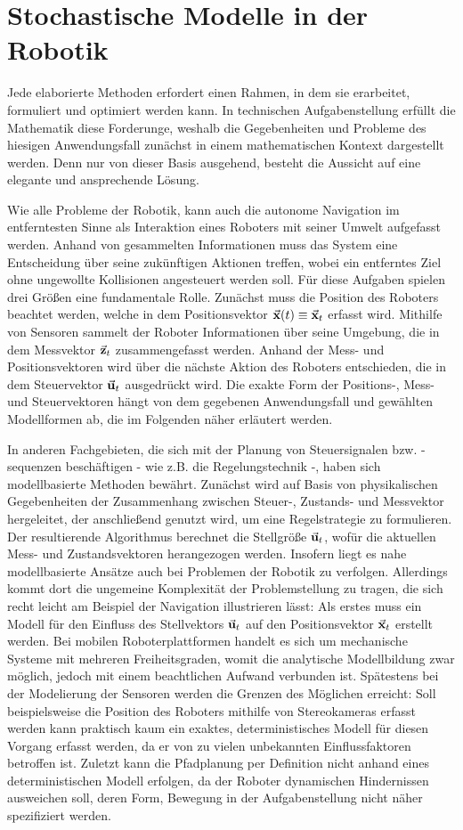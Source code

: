 \chapter{Stochastische Modelle in der Robotik}
Jede elaborierte Methoden erfordert einen Rahmen, in dem sie erarbeitet, formuliert und optimiert werden kann. In technischen Aufgabenstellung erfüllt die Mathematik diese Forderunge, weshalb die Gegebenheiten und Probleme des hiesigen Anwendungsfall zunächst in einem mathematischen Kontext dargestellt werden. Denn nur von dieser Basis ausgehend, besteht die Aussicht auf eine elegante und ansprechende Lösung.

Wie alle Probleme der Robotik, kann auch die autonome Navigation im entferntesten Sinne als Interaktion eines Roboters mit seiner Umwelt aufgefasst werden. Anhand von gesammelten Informationen muss das System eine Entscheidung über seine zukünftigen Aktionen treffen, wobei ein entferntes Ziel ohne ungewollte Kollisionen angesteuert werden soll. Für diese Aufgaben spielen drei Größen eine fundamentale Rolle. Zunächst muss die Position des Roboters beachtet werden, welche in dem Positionsvektor $\vec{\mathbf{x}}(t) \equiv \vec{\mathbf{x}}_t$ erfasst wird. Mithilfe von Sensoren sammelt der Roboter Informationen über seine Umgebung, die in dem Messvektor $\vec{\mathbf{z}}_t$ zusammengefasst werden. Anhand der Mess- und Positionsvektoren wird über die nächste Aktion des Roboters entschieden, die in dem Steuervektor $\vec{\mathbf{u}}_t$ ausgedrückt wird. Die exakte Form der Positions-, Mess- und Steuervektoren hängt von dem gegebenen Anwendungsfall und gewählten Modellformen ab, die im Folgenden näher erläutert werden.

In anderen Fachgebieten, die sich mit der Planung von Steuersignalen bzw. -sequenzen beschäftigen - wie z.B. die Regelungstechnik -, haben sich modellbasierte Methoden bewährt. Zunächst wird auf Basis von physikalischen Gegebenheiten der Zusammenhang zwischen Steuer-, Zustands- und Messvektor hergeleitet, der anschließend genutzt wird, um eine Regelstrategie zu formulieren. Der resultierende Algorithmus berechnet die Stellgröße $\vec{\mathbf{u}}_t$, wofür die aktuellen Mess- und Zustandsvektoren herangezogen werden. Insofern liegt es nahe modellbasierte Ansätze auch bei Problemen der Robotik zu verfolgen. Allerdings kommt dort die ungemeine Komplexität der Problemstellung zu tragen, die sich recht leicht am Beispiel der Navigation illustrieren lässt: Als erstes muss ein Modell für den Einfluss des Stellvektors $\vec{\mathbf{u}}_t$ auf den Positionsvektor $\vec{\mathbf{x}}_t$ erstellt werden. Bei mobilen Roboterplattformen handelt es sich um mechanische Systeme mit mehreren Freiheitsgraden, womit die analytische Modellbildung zwar möglich, jedoch mit einem beachtlichen Aufwand verbunden ist. Spätestens bei der Modelierung der Sensoren werden die Grenzen des Möglichen erreicht: Soll beispielsweise die Position des Roboters mithilfe von Stereokameras erfasst werden kann praktisch kaum ein exaktes, deterministisches Modell für diesen Vorgang erfasst werden, da er von zu vielen unbekannten Einflussfaktoren betroffen ist. Zuletzt kann die Pfadplanung per Definition nicht anhand eines deterministischen Modell erfolgen, da der Roboter dynamischen Hindernissen ausweichen soll, deren Form, Bewegung in der Aufgabenstellung nicht näher spezifiziert werden.

